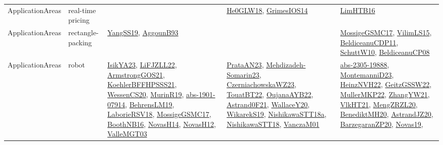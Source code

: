 {\begin{longtable}{lp{3cm}>{\raggedright}p{6cm}>{\raggedright}p{6cm}p{8cm}}
ApplicationAreas & real-time pricing &  & \href{papers/He0GLW18.pdf}{He0GLW18}\cite{He0GLW18}, \href{articles/GrimesIOS14.pdf}{GrimesIOS14}\cite{GrimesIOS14} & \href{papers/LimHTB16.pdf}{LimHTB16}\cite{LimHTB16}\\
ApplicationAreas & rectangle-packing & \href{papers/YangSS19.pdf}{YangSS19}\cite{YangSS19}, \href{articles/AggounB93.pdf}{AggounB93}\cite{AggounB93} &  & \href{papers/MossigeGSMC17.pdf}{MossigeGSMC17}\cite{MossigeGSMC17}, \href{papers/VilimLS15.pdf}{VilimLS15}\cite{VilimLS15}, \href{articles/BeldiceanuCDP11.pdf}{BeldiceanuCDP11}\cite{BeldiceanuCDP11}, \href{papers/SchuttW10.pdf}{SchuttW10}\cite{SchuttW10}, \href{papers/BeldiceanuCP08.pdf}{BeldiceanuCP08}\cite{BeldiceanuCP08}\\
ApplicationAreas & robot & \href{articles/IsikYA23.pdf}{IsikYA23}\cite{IsikYA23}, \href{papers/LiFJZLL22.pdf}{LiFJZLL22}\cite{LiFJZLL22}, \href{papers/ArmstrongGOS21.pdf}{ArmstrongGOS21}\cite{ArmstrongGOS21}, \href{articles/KoehlerBFFHPSSS21.pdf}{KoehlerBFFHPSSS21}\cite{KoehlerBFFHPSSS21}, \href{papers/WessenCS20.pdf}{WessenCS20}\cite{WessenCS20}, \href{papers/MurinR19.pdf}{MurinR19}\cite{MurinR19}, \href{articles/abs-1901-07914.pdf}{abs-1901-07914}\cite{abs-1901-07914}, \href{papers/BehrensLM19.pdf}{BehrensLM19}\cite{BehrensLM19}, \href{articles/LaborieRSV18.pdf}{LaborieRSV18}\cite{LaborieRSV18}, \href{papers/MossigeGSMC17.pdf}{MossigeGSMC17}\cite{MossigeGSMC17}, \href{papers/BoothNB16.pdf}{BoothNB16}\cite{BoothNB16}, \href{articles/NovasH14.pdf}{NovasH14}\cite{NovasH14}, \href{articles/NovasH12.pdf}{NovasH12}\cite{NovasH12}, \href{papers/ValleMGT03.pdf}{ValleMGT03}\cite{ValleMGT03} & \href{articles/PrataAN23.pdf}{PrataAN23}\cite{PrataAN23}, \href{papers/Mehdizadeh-Somarin23.pdf}{Mehdizadeh-Somarin23}\cite{Mehdizadeh-Somarin23}, \href{articles/CzerniachowskaWZ23.pdf}{CzerniachowskaWZ23}\cite{CzerniachowskaWZ23}, \href{papers/TouatBT22.pdf}{TouatBT22}\cite{TouatBT22}, \href{papers/OujanaAYB22.pdf}{OujanaAYB22}\cite{OujanaAYB22}, \href{papers/Astrand0F21.pdf}{Astrand0F21}\cite{Astrand0F21}, \href{articles/WallaceY20.pdf}{WallaceY20}\cite{WallaceY20}, \href{articles/WikarekS19.pdf}{WikarekS19}\cite{WikarekS19}, \href{papers/NishikawaSTT18a.pdf}{NishikawaSTT18a}\cite{NishikawaSTT18a}, \href{papers/NishikawaSTT18.pdf}{NishikawaSTT18}\cite{NishikawaSTT18}, \href{papers/VanczaM01.pdf}{VanczaM01}\cite{VanczaM01} & \href{articles/abs-2305-19888.pdf}{abs-2305-19888}\cite{abs-2305-19888}, \href{articles/MontemanniD23.pdf}{MontemanniD23}\cite{MontemanniD23}, \href{articles/HeinzNVH22.pdf}{HeinzNVH22}\cite{HeinzNVH22}, \href{papers/GeitzGSSW22.pdf}{GeitzGSSW22}\cite{GeitzGSSW22}, \href{articles/MullerMKP22.pdf}{MullerMKP22}\cite{MullerMKP22}, \href{articles/ZhangYW21.pdf}{ZhangYW21}\cite{ZhangYW21}, \href{articles/VlkHT21.pdf}{VlkHT21}\cite{VlkHT21}, \href{articles/MengZRZL20.pdf}{MengZRZL20}\cite{MengZRZL20}, \href{articles/BenediktMH20.pdf}{BenediktMH20}\cite{BenediktMH20}, \href{articles/AstrandJZ20.pdf}{AstrandJZ20}\cite{AstrandJZ20}, \href{papers/BarzegaranZP20.pdf}{BarzegaranZP20}\cite{BarzegaranZP20}, \href{articles/Novas19.pdf}{Novas19}\cite{Novas19}, 
\end{longtable}}
